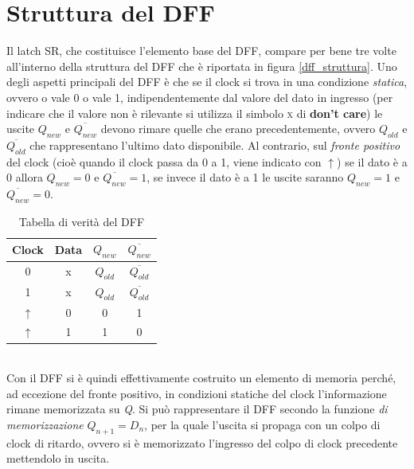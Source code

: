 \documentclass[12pt, a4paper]{report}
\begin{document}
\section{Struttura del DFF}
Il latch SR, che costituisce l'elemento base del DFF, compare per bene tre volte all'interno della struttura del DFF che è riportata in figura \ref{dff_struttura}. Uno degli aspetti principali del DFF è che se il clock si trova in una condizione \textit{statica}, ovvero o vale 0 o vale 1, indipendentemente dal valore del dato in ingresso (per indicare che il valore non è rilevante si utilizza il simbolo \textsc{x} di \textbf{don't care}) le uscite $Q_{new}$ e $\overline{Q_{new}}$ devono rimare quelle che erano precedentemente, ovvero $Q_{old}$ e $\overline{Q_{old}}$ che rappresentano l'ultimo dato disponibile. Al contrario, sul \textit{fronte positivo} del clock (cioè quando il clock passa da 0 a 1, viene indicato con $\uparrow$) se il dato è a 0 allora $Q_{new} = 0$ e $\overline{Q_{new}} = 1$, se invece il dato è a 1 le uscite saranno $Q_{new} = 1$ e $\overline{Q_{new}} = 0$.
\begin{table}[h]
    \centering
    \begin{tabular}{c c | c c }
    Clock &Data &$Q_{new}$ &$\overline{Q_{new}}$\\\hline
    0 &x &$Q_{old}$ &$\overline{Q_{old}}$\\
    1 &x &$Q_{old}$ &$\overline{Q_{old}}$\\
    $\uparrow$ &0 &0 &1\\
    $\uparrow$ &1 &1 &0
    \end{tabular}
    \caption{Tabella di verità del DFF}
\end{table}
\\Con il DFF si è quindi effettivamente costruito un elemento di memoria perché, ad eccezione del fronte positivo, in condizioni statiche del clock l'informazione rimane memorizzata su \textit{Q}. Si può rappresentare il DFF secondo la funzione \textit{di memorizzazione} $Q_{n+1} = D_{n}$, per la quale l'uscita si propaga con un colpo di clock di ritardo, ovvero si è memorizzato l'ingresso del colpo di clock precedente mettendolo in uscita.
\end{document}
